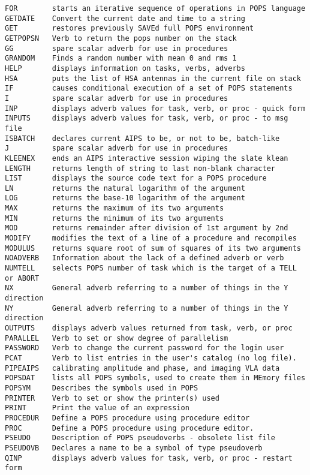 \begin{verbatim}
FOR        starts an iterative sequence of operations in POPS language
GETDATE    Convert the current date and time to a string
GET        restores previously SAVEd full POPS environment
GETPOPSN   Verb to return the pops number on the stack
GG         spare scalar adverb for use in procedures
GRANDOM    Finds a random number with mean 0 and rms 1
HELP       displays information on tasks, verbs, adverbs
HSA        puts the list of HSA antennas in the current file on stack
IF         causes conditional execution of a set of POPS statements
I          spare scalar adverb for use in procedures
INP        displays adverb values for task, verb, or proc - quick form
INPUTS     displays adverb values for task, verb, or proc - to msg file
ISBATCH    declares current AIPS to be, or not to be, batch-like
J          spare scalar adverb for use in procedures
KLEENEX    ends an AIPS interactive session wiping the slate klean
LENGTH     returns length of string to last non-blank character
LIST       displays the source code text for a POPS procedure
LN         returns the natural logarithm of the argument
LOG        returns the base-10 logarithm of the argument
MAX        returns the maximum of its two arguments
MIN        returns the minimum of its two arguments
MOD        returns remainder after division of 1st argument by 2nd
MODIFY     modifies the text of a line of a procedure and recompiles
MODULUS    returns square root of sum of squares of its two arguments
NOADVERB   Information about the lack of a defined adverb or verb
NUMTELL    selects POPS number of task which is the target of a TELL or ABORT
NX         General adverb referring to a number of things in the Y direction
NY         General adverb referring to a number of things in the Y direction
OUTPUTS    displays adverb values returned from task, verb, or proc
PARALLEL   Verb to set or show degree of parallelism
PASSWORD   Verb to change the current password for the login user
PCAT       Verb to list entries in the user's catalog (no log file).
PIPEAIPS   calibrating amplitude and phase, and imaging VLA data
POPSDAT    lists all POPS symbols, used to create them in MEmory files
POPSYM     Describes the symbols used in POPS
PRINTER    Verb to set or show the printer(s) used
PRINT      Print the value of an expression
PROCEDUR   Define a POPS procedure using procedure editor
PROC       Define a POPS procedure using procedure editor.
PSEUDO     Description of POPS pseudoverbs - obsolete list file
PSEUDOVB   Declares a name to be a symbol of type pseudoverb
QINP       displays adverb values for task, verb, or proc - restart form

\end{verbatim}
